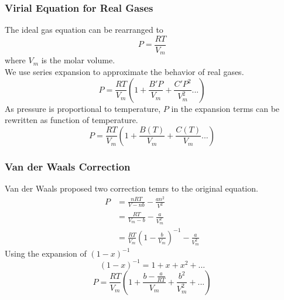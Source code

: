 \documentclass[letterpaper]{article}
\begin{document}
\subsubsection*{Virial Equation for Real Gases}
The ideal gas equation can be rearranged to
\begin{equation*}
    P=\frac{RT}{V_m}
\end{equation*}
where $V_m$ is the molar volume.\\
We use series expansion to approximate the behavior of real gases.
\begin{equation*}
    P=\frac{RT}{V_m}(1 + \frac{B'P}{V_m} + \frac{C'P^2}{V_m^2} ...)
\end{equation*}
As pressure is proportional to temperature, $P$ in the expansion terms can be rewritten as function of temperature.
\begin{equation*}
    P=\frac{RT}{V_m}(1+\frac{B(T)}{V_m}+\frac{C(T)}{V_m}...)
\end{equation*}
\subsubsection*{Van der Waals Correction}
Van der Waals proposed two correction temrs to the original equation.
\begin{equation*}
    \begin{aligned}
        P&=\frac{nRT}{V-nb}-\frac{an^2}{V^2}\\
        &=\frac{RT}{V_m-b}-\frac{a}{V_m^2}\\
        &=\frac{RT}{V_m}(1-\frac{b}{V_m})^{-1}-\frac{a}{V_m^2}
    \end{aligned}
\end{equation*}
Using the expansion of $(1-x)^{-1}$
\begin{equation*}
    (1-x)^{-1}=1+x+x^2+...
\end{equation*}
\begin{equation*}
    P=\frac{RT}{V_m}(1+\frac{b-\frac{a}{RT}}{V_m}+\frac{b^2}{V_m^2}+...)
\end{equation*}
\end{document}
